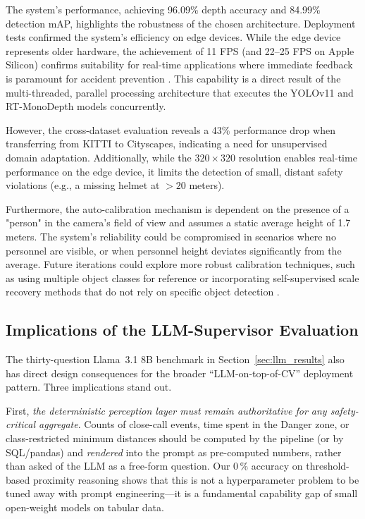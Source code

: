 \documentclass{article}
\begin{document}
The system's performance, achieving 96.09\% depth accuracy and 84.99\% detection mAP, highlights the robustness of the chosen architecture. Deployment tests confirmed the system's efficiency on edge devices. While the edge device represents older hardware, the achievement of 11 FPS (and 22–25 FPS on Apple Silicon) confirms suitability for real-time applications where immediate feedback is paramount for accident prevention \cite{feng2024}. This capability is a direct result of the multi-threaded, parallel processing architecture that executes the YOLOv11 and RT-MonoDepth models concurrently.

However, the cross-dataset evaluation reveals a 43\% performance drop when transferring from KITTI to Cityscapes, indicating a need for unsupervised domain adaptation. Additionally, while the $320 \times 320$ resolution enables real-time performance on the edge device, it limits the detection of small, distant safety violations (e.g., a missing helmet at $>20$ meters).

Furthermore, the auto-calibration mechanism is dependent on the presence of a "person" in the camera's field of view and assumes a static average height of 1.7 meters. The system's reliability could be compromised in scenarios where no personnel are visible, or when personnel height deviates significantly from the average. Future iterations could explore more robust calibration techniques, such as using multiple object classes for reference or incorporating self-supervised scale recovery methods that do not rely on specific object detection \cite{shen2023}.

\subsection{Implications of the LLM-Supervisor Evaluation}
\label{sec:discussion_llm}
The thirty-question Llama~3.1 8B benchmark in Section~\ref{sec:llm_results} also has direct design consequences for the broader ``LLM-on-top-of-CV'' deployment pattern. Three implications stand out.

First, \emph{the deterministic perception layer must remain authoritative for any safety-critical aggregate}. Counts of close-call events, time spent in the Danger zone, or class-restricted minimum distances should be computed by the pipeline (or by SQL/pandas) and \emph{rendered} into the prompt as pre-computed numbers, rather than asked of the LLM as a free-form question. Our 0\,\% accuracy on threshold-based proximity reasoning shows that this is not a hyperparameter problem to be tuned away with prompt engineering---it is a fundamental capability gap of small open-weight models on tabular data.
\end{document}
